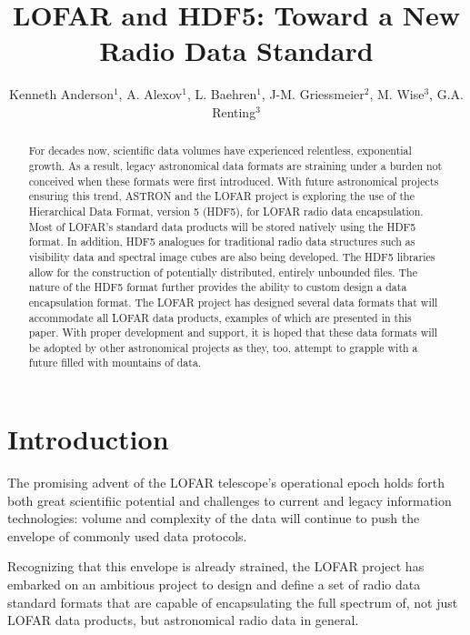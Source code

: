 \documentclass[11pt,twoside]{article}
\begin{document}
\title{LOFAR and HDF5: Toward a New Radio Data Standard}
\author{Kenneth Anderson$^1$, A. Alexov$^1$, L. Baehren$^1$, J-M. Griessmeier$^2$,
M. Wise$^3$, G.A. Renting$^3$}
\begin{abstract}
For decades now, scientific data volumes have experienced relentless, exponential growth.
As a result, legacy astronomical data formats are straining under a burden not conceived
when these formats were first introduced. With future astronomical projects ensuring this
trend, ASTRON and the LOFAR project is exploring the use of the Hierarchical Data Format,
version 5 (HDF5), for LOFAR radio data encapsulation. Most of LOFAR's standard data products
will be stored natively using the HDF5 format. In addition, HDF5 analogues for traditional
radio data structures such as visibility data and spectral image cubes are also being developed.
The HDF5 libraries allow for the construction of potentially distributed, entirely unbounded files.
The nature of the HDF5 format further provides the ability to custom design a data encapsulation format.
The LOFAR project has designed several data formats that will accommodate all LOFAR data products, examples
of which are presented in this paper. With proper development and support,
it is hoped that these data formats will be adopted by other astronomical projects as they, too,
attempt to grapple with a future filled with mountains of data.
\end{abstract}
\section{Introduction}
The promising advent of the LOFAR telescope's operational epoch holds forth both great scientifiic
potential and challenges to current and legacy information technologies: volume and complexity of
the data will continue to push the envelope of commonly used data protocols.

Recognizing that this envelope is already strained, the LOFAR project has embarked on an ambitious
project to design and define a set of radio data standard formats that are capable of encapsulating
the full spectrum of, not just LOFAR data products, but astronomical radio data in general.
\end{document}

